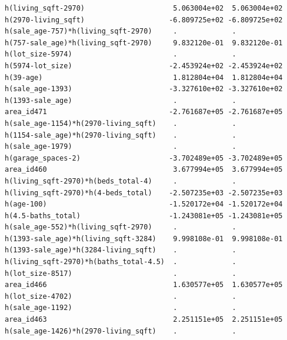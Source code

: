 \documentclass[
]{article}
\begin{document}
\begin{verbatim}
h(living_sqft-2970)                     5.063004e+02  5.063004e+02
h(2970-living_sqft)                    -6.809725e+02 -6.809725e+02
h(sale_age-757)*h(living_sqft-2970)     .             .           
h(757-sale_age)*h(living_sqft-2970)     9.832120e-01  9.832120e-01
h(lot_size-5974)                        .             .           
h(5974-lot_size)                       -2.453924e+02 -2.453924e+02
h(39-age)                               1.812804e+04  1.812804e+04
h(sale_age-1393)                       -3.327610e+02 -3.327610e+02
h(1393-sale_age)                        .             .           
area_id471                             -2.761687e+05 -2.761687e+05
h(sale_age-1154)*h(2970-living_sqft)    .             .           
h(1154-sale_age)*h(2970-living_sqft)    .             .           
h(sale_age-1979)                        .             .           
h(garage_spaces-2)                     -3.702489e+05 -3.702489e+05
area_id460                              3.677994e+05  3.677994e+05
h(living_sqft-2970)*h(beds_total-4)     .             .           
h(living_sqft-2970)*h(4-beds_total)    -2.507235e+03 -2.507235e+03
h(age-100)                             -1.520172e+04 -1.520172e+04
h(4.5-baths_total)                     -1.243081e+05 -1.243081e+05
h(sale_age-552)*h(living_sqft-2970)     .             .           
h(1393-sale_age)*h(living_sqft-3284)    9.998108e-01  9.998108e-01
h(1393-sale_age)*h(3284-living_sqft)    .             .           
h(living_sqft-2970)*h(baths_total-4.5)  .             .           
h(lot_size-8517)                        .             .           
area_id466                              1.630577e+05  1.630577e+05
h(lot_size-4702)                        .             .           
h(sale_age-1192)                        .             .           
area_id463                              2.251151e+05  2.251151e+05
h(sale_age-1426)*h(2970-living_sqft)    .             .           
                                                                  

\end{verbatim}
\end{document}
